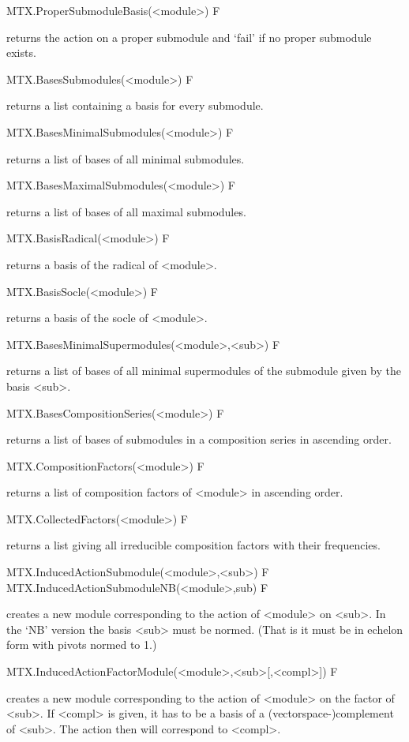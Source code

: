 \>MTX.ProperSubmoduleBasis(<module>) F

returns the action on a proper submodule and `fail' if no proper submodule
exists.

\>MTX.BasesSubmodules(<module>) F

returns a list containing a basis for every submodule.

\>MTX.BasesMinimalSubmodules(<module>) F

returns a list of bases of all minimal submodules.

\>MTX.BasesMaximalSubmodules(<module>) F

returns a list of bases of all maximal submodules.

\>MTX.BasisRadical(<module>) F

returns a basis of the radical of <module>.

\>MTX.BasisSocle(<module>) F

returns a basis of the socle of <module>.

\>MTX.BasesMinimalSupermodules(<module>,<sub>) F

returns a list of bases of all minimal supermodules of the submodule given by
the basis <sub>.

\>MTX.BasesCompositionSeries(<module>) F

returns a list of bases of submodules in a composition series in ascending
order.

\>MTX.CompositionFactors(<module>) F

returns a list of composition factors of <module> in ascending order.

\>MTX.CollectedFactors(<module>) F

returns a list giving all irreducible composition factors with their
frequencies.


\>MTX.InducedActionSubmodule(<module>,<sub>) F
\>MTX.InducedActionSubmoduleNB(<module>,sub) F

creates a new module corresponding to the action of <module> on <sub>. In
the `NB' version the basis <sub> must be normed. (That is it must be in
echelon form with pivots normed to 1.)

\>MTX.InducedActionFactorModule(<module>,<sub>[,<compl>]) F

creates a new module corresponding to the action of <module> on the
factor of <sub>. If <compl> is given, it has to be a basis of a
(vectorspace-)complement of <sub>. The action then will correspond to
<compl>.

